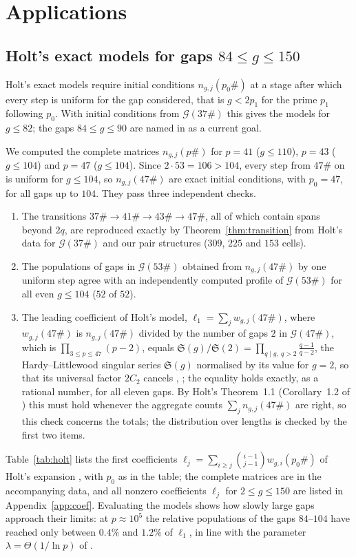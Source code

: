 \documentclass[11pt]{article}
\theoremstyle{definition}
\theoremstyle{remark}
\newcommand{\G}{\mathcal{G}}
\begin{document}
\section{Applications}\label{sec:applications}

\subsection{Holt's exact models for gaps \texorpdfstring{$84 \le g \le 150$}{84 <= g <= 150}}\label{sec:holt}

Holt's exact models require initial conditions $n_{g,j}(p_0\#)$ at a stage after which every step is uniform for the gap considered, that is $g < 2p_1$ for the prime $p_1$ following $p_0$. With initial conditions from $\G(37\#)$ this gives the models for $g \le 82$; the gaps $84 \le g \le 90$ are named in \cite[\S5]{Ho26} as a current goal.

We computed the complete matrices $n_{g,j}(p\#)$ for $p = 41$ ($g \le 110$), $p = 43$ ($g \le 104$) and $p = 47$ ($g \le 104$). Since $2 \cdot 53 = 106 > 104$, every step from $47\#$ on is uniform for $g \le 104$, so $n_{g,j}(47\#)$ are exact initial conditions, with $p_0 = 47$, for all gaps up to $104$. They pass three independent checks.
\begin{enumerate}
\item The transitions $37\# \to 41\# \to 43\# \to 47\#$, all of which contain spans beyond $2q$, are reproduced exactly by Theorem~\ref{thm:transition} from Holt's data for $\G(37\#)$ and our pair structures ($309$, $225$ and $153$ cells).
\item The populations of gaps in $\G(53\#)$ obtained from $n_{g,j}(47\#)$ by one uniform step agree with an independently computed profile of $\G(53\#)$ for all even $g \le 104$ ($52$ of $52$).
\item The leading coefficient of Holt's model, $\ell_1 = \sum_j w_{g,j}(47\#)$, where $w_{g,j}(47\#)$ is $n_{g,j}(47\#)$ divided by the number of gaps $2$ in $\G(47\#)$, which is $\prod_{3 \le p \le 47}(p-2)$, equals $\mathfrak{S}(g)/\mathfrak{S}(2) = \prod_{q \mid g,\ q > 2} \frac{q-1}{q-2}$, the Hardy--Littlewood singular series $\mathfrak{S}(g)$ normalised by its value for $g = 2$, so that its universal factor $2C_2$ cancels \cite[eq.~(1.3)]{Ho26}, \cite{HL23}; the equality holds exactly, as a rational number, for all eleven gaps. By Holt's Theorem~1.1 \cite{Ho26} (Corollary~1.2 of \cite{Ho25}) this must hold whenever the aggregate counts $\sum_j n_{g,j}(47\#)$ are right, so this check concerns the totals; the distribution over lengths is checked by the first two items.
\end{enumerate}
Table~\ref{tab:holt} lists the first coefficients $\ell_j = \sum_{i \ge j} \binom{i-1}{j-1} w_{g,i}(p_0\#)$ of Holt's expansion \cite[eq.~(1.2)]{Ho26}, with $p_0$ as in the table; the complete matrices are in the accompanying data, and all nonzero coefficients $\ell_j$ for $2 \le g \le 150$ are listed in Appendix~\ref{app:coef}. Evaluating the models shows how slowly large gaps approach their limits: at $p \approx 10^5$ the relative populations of the gaps $84$--$104$ have reached only between $0.4\%$ and $1.2\%$ of $\ell_1$, in line with the parameter $\lambda = \Theta(1/\ln p)$ of \cite{Ho26}.
\end{document}
